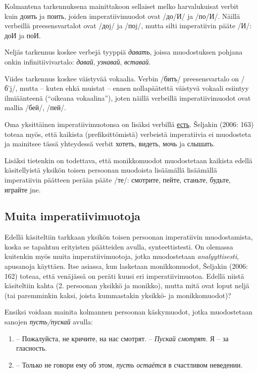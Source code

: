 \documentclass[]{scrartcl}
\providecommand{\tightlist}{%
  \setlength{\itemsep}{0pt}\setlength{\parskip}{0pt}}
\begin{document}
Kolmantena tarkennuksena mainittakoon sellaiset melko harvalukuisat
verbit kuin доить ja поить, joiden imperatiivimuodot ovat /до/И/ ja
/по/И/. Näillä verbeillä preesensvartalot ovat /доj/ ja /поj/, mutta
silti imperatiivin pääte /И/: доИ ja поИ.

Neljäs tarkennus koskee verbejä tyyppiä \emph{давать}, joissa
muodostuksen pohjana onkin infinitiivivartalo: \emph{давай},
\emph{узнавай}, \emph{вставай}.

Viides tarkennus koskee väistyvää vokaalia. Verbin /бить/
preesensvartalo on /б'j/, mutta -- kuten ehkä muistat -- ennen
nollapäätettä väistyvä vokaali esiintyy ilmiäänteenä (``oikeana
vokaalina''), joten näillä verbeillä imperatiivimuodot ovat mallia
/бей/, /пей/.

Oma yksittäinen imperatiivimuotonsa on lisäksi verbillä
\href{http://ru.wiktionary.org/wiki/есть}{есть}. Šeljakin (2006: 163)
toteaa myös, että kaikista (prefiksittömistä) verbeistä imperatiivia ei
muodosteta ja mainitsee tässä yhteydessä verbit хотеть, видеть, мочь ja
слышать.

Lisäksi tietenkin on todettava, että monikkomuodot muodostetaan kaikista
edellä käsitellyistä yksikön toisen persoonan muodoista lisäämällä
lisäämällä imperatiivin päätteen perään pääte /те/: смотрите, пейте,
станьте, будьте, играйте jne.

\subsection{Muita imperatiivimuotoja}\label{muita-imperatiivimuotoja}

Edellä käsiteltiin tarkkaan yksikön toisen persoonan imperatiivin
muodostamista, koska se tapahtuu erityisten päätteiden avulla,
synteettistesti. On olemassa kuitenkin myös muita imperatiivimuotoja,
jotka muodostetaan \emph{analyyttisesti}, apusanoja käyttäen. Itse
asiassa, kun lasketaan monikkomuodot, Šeljakin (2006: 162) toteaa, että
venäjässä on peräti kuusi eri imperatiivimuotoa. Edellä niistä
käsiteltiin kahta (2. persoonan yksikkö ja monikko), mutta mitä ovat
loput neljä (tai paremminkin kaksi, joista kummastakin yksikkö- ja
monikkomuodot)?

Ensiksi voidaan mainita kolmannen persoonan käskymuodot, jotka
muodostetaan sanojen \emph{пусть/пускай} avulla:

\begin{enumerate}
\def\labelenumi{(\arabic{enumi})}
\setcounter{enumi}{6}
\tightlist
\item
  -- Пожалуйста, не кричите, на нас смотрят. -- \emph{Пускай смотрят}. Я
  -- за гласность.
\item
  -- Только не говори ему об этом, \emph{пусть остаётся} в счастливом
  неведении.
\end{enumerate}
\end{document}
